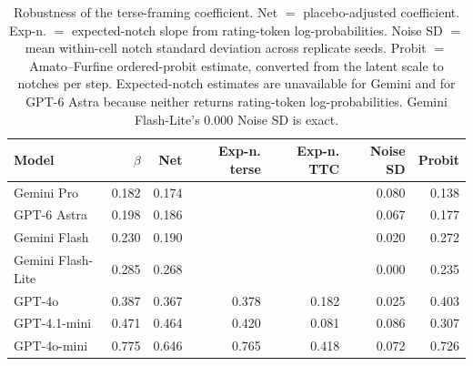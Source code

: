 \begin{table}[t]
\centering
\caption{Robustness of the terse-framing coefficient. Net $=$ placebo-adjusted coefficient. Exp-n. $=$ expected-notch slope from rating-token log-probabilities. Noise SD $=$ mean within-cell notch standard deviation across replicate seeds. Probit $=$ Amato--Furfine ordered-probit estimate, converted from the latent scale to notches per step. Expected-notch estimates are unavailable for Gemini and for GPT-6 Astra because neither returns rating-token log-probabilities. Gemini Flash-Lite's $0.000$ Noise SD is exact.}
\label{tab:robust}
\begin{tabular}{lrrrrrr}
\toprule
Model & $\beta$ & Net & Exp-n. terse & Exp-n. TTC & Noise SD & Probit \\
\midrule
Gemini Pro & 0.182 & 0.174 &  &  & 0.080 & 0.138 \\
GPT-6 Astra & 0.198 & 0.186 &  &  & 0.067 & 0.177 \\
Gemini Flash & 0.230 & 0.190 &  &  & 0.020 & 0.272 \\
Gemini Flash-Lite & 0.285 & 0.268 &  &  & 0.000 & 0.235 \\
GPT-4o & 0.387 & 0.367 & 0.378 & 0.182 & 0.025 & 0.403 \\
GPT-4.1-mini & 0.471 & 0.464 & 0.420 & 0.081 & 0.086 & 0.307 \\
GPT-4o-mini & 0.775 & 0.646 & 0.765 & 0.418 & 0.072 & 0.726 \\
\bottomrule
\end{tabular}
\end{table}